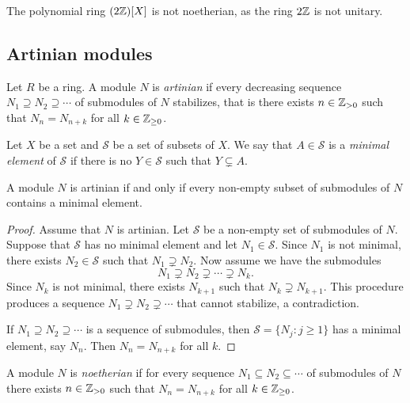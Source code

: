 \begin{example}
    The polynomial ring $(2\mathbb{Z})[X]$ is not 
    noetherian, as the ring $2\mathbb{Z}$ is not unitary. 
\end{example}

\subsection{Artinian modules}

\begin{definition}
	Let $R$ be a ring. A module $N$ is \emph{artinian} if every decreasing sequence 
	$N_1\supseteq N_2\supseteq\cdots$ of submodules of $N$ stabilizes, that is
	there exists $n\in\mathbb{Z}_{>0}$ such that 
	$N_n=N_{n+k}$ for all $k\in\mathbb{Z}_{\geq0}$.
\end{definition}

Let $X$ be a set and $\mathcal{S}$ be a set of subsets of $X$. 
We say that $A\in\mathcal{S}$ is a \emph{minimal element} of $\mathcal{S}$
if there is no $Y\in\mathcal{S}$ such that $Y\subsetneq A$. 

\begin{proposition}
\label{pro:artinian_minimal}
	A module $N$ is artinian if and only if 
	every non-empty subset of submodules of $N$ 
	contains a minimal element. 
\end{proposition}

\begin{proof}
	Assume that $N$ is artinian. Let $\mathcal{S}$ be a non-empty set of submodules of $N$. 
	Suppose that $\mathcal{S}$ has no minimal element and let $N_1\in\mathcal{S}$. 
	Since $N_1$ is not minimal, there exists 
	$N_2\in\mathcal{S}$ such that $N_1\supsetneq N_2$. Now assume we have the submodules 
	\[
	N_1\supsetneq N_2\supsetneq\cdots\supsetneq N_k.
	\]
	Since $N_k$ is not minimal, there exists $N_{k+1}$ such that $N_k\supsetneq N_{k+1}$.
	This procedure produces a sequence $N_1\supsetneq
	N_2\supsetneq\cdots$ that cannot stabilize, a contradiction. 
	
	If $N_1\supseteq N_2\supseteq\cdots$ is a sequence of submodules, then 
	$\mathcal{S}=\{N_j:j\geq1\}$ has a minimal element, say $N_n$. Then
	$N_n=N_{n+k}$ for all $k$. 
\end{proof}

A module $N$ is \emph{noetherian} if for every sequence 
$N_1\subseteq N_2\subseteq\cdots$ of submodules of $N$ there exists $n\in\mathbb{Z}_{>0}$ such that 
$N_n=N_{n+k}$ for all $k\in\mathbb{Z}_{\geq0}$. 

